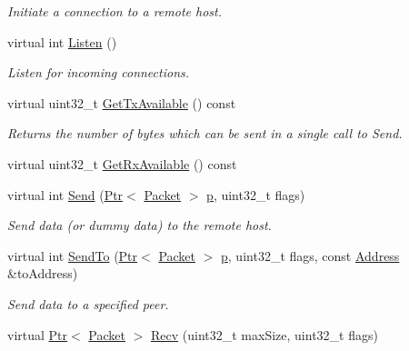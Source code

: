 \begin{DoxyCompactItemize}
\begin{DoxyCompactList}\small\item\em Initiate a connection to a remote host. \end{DoxyCompactList}\item 
virtual int \hyperlink{classns3_1_1Ipv6RawSocketImpl_a1b0f410496348c5869a1c86437172b2a}{Listen} ()
\begin{DoxyCompactList}\small\item\em Listen for incoming connections. \end{DoxyCompactList}\item 
virtual uint32\+\_\+t \hyperlink{classns3_1_1Ipv6RawSocketImpl_a1edb9813fe9214132899b93da6e3684d}{Get\+Tx\+Available} () const 
\begin{DoxyCompactList}\small\item\em Returns the number of bytes which can be sent in a single call to Send. \end{DoxyCompactList}\item 
virtual uint32\+\_\+t \hyperlink{classns3_1_1Ipv6RawSocketImpl_af96fcf5ece8867992a4ccdad54ffc90b}{Get\+Rx\+Available} () const 
\item 
virtual int \hyperlink{classns3_1_1Ipv6RawSocketImpl_a889224d7c084b74b3a1a3511899a04f3}{Send} (\hyperlink{classns3_1_1Ptr}{Ptr}$<$ \hyperlink{classns3_1_1Packet}{Packet} $>$ \hyperlink{lte__link__budget__x2__handover__measures_8m_ac9de518908a968428863f829398a4e62}{p}, uint32\+\_\+t flags)
\begin{DoxyCompactList}\small\item\em Send data (or dummy data) to the remote host. \end{DoxyCompactList}\item 
virtual int \hyperlink{classns3_1_1Ipv6RawSocketImpl_aadff84e3c8a3ce3bc4f10a3d7a4dbac8}{Send\+To} (\hyperlink{classns3_1_1Ptr}{Ptr}$<$ \hyperlink{classns3_1_1Packet}{Packet} $>$ \hyperlink{lte__link__budget__x2__handover__measures_8m_ac9de518908a968428863f829398a4e62}{p}, uint32\+\_\+t flags, const \hyperlink{classns3_1_1Address}{Address} \&to\+Address)
\begin{DoxyCompactList}\small\item\em Send data to a specified peer. \end{DoxyCompactList}\item 
virtual \hyperlink{classns3_1_1Ptr}{Ptr}$<$ \hyperlink{classns3_1_1Packet}{Packet} $>$ \hyperlink{classns3_1_1Ipv6RawSocketImpl_a2e86d6b6c347fe37a577ba0d9fcb411d}{Recv} (uint32\+\_\+t max\+Size, uint32\+\_\+t flags)

\end{DoxyCompactItemize}
